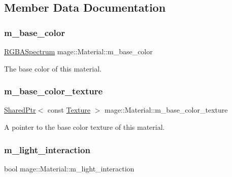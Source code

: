 \subsection{Member Data Documentation}
\hypertarget{structmage_1_1_material_a3425f685923d7cf24117c93385122e4b}{}\label{structmage_1_1_material_a3425f685923d7cf24117c93385122e4b} 
\subsubsection{\texorpdfstring{m\+\_\+base\+\_\+color}{m\_base\_color}}
{\footnotesize\ttfamily \hyperlink{structmage_1_1_r_g_b_a_spectrum}{R\+G\+B\+A\+Spectrum} mage\+::\+Material\+::m\+\_\+base\+\_\+color\hspace{0.3cm}{\ttfamily [private]}}

The base color of this material. \hypertarget{structmage_1_1_material_ae3d40b79a275a212ea7068b0c3f8840c}{}\label{structmage_1_1_material_ae3d40b79a275a212ea7068b0c3f8840c} 
\subsubsection{\texorpdfstring{m\+\_\+base\+\_\+color\+\_\+texture}{m\_base\_color\_texture}}
{\footnotesize\ttfamily \hyperlink{namespacemage_a1e01ae66713838a7a67d30e44c67703e}{Shared\+Ptr}$<$ const \hyperlink{classmage_1_1_texture}{Texture} $>$ mage\+::\+Material\+::m\+\_\+base\+\_\+color\+\_\+texture\hspace{0.3cm}{\ttfamily [private]}}

A pointer to the base color texture of this material. \hypertarget{structmage_1_1_material_a636ddbd882e3ff2841c192c5ecbc5053}{}\label{structmage_1_1_material_a636ddbd882e3ff2841c192c5ecbc5053} 
\subsubsection{\texorpdfstring{m\+\_\+light\+\_\+interaction}{m\_light\_interaction}}
{\footnotesize\ttfamily bool mage\+::\+Material\+::m\+\_\+light\+\_\+interaction\hspace{0.3cm}{\ttfamily [private]}}

